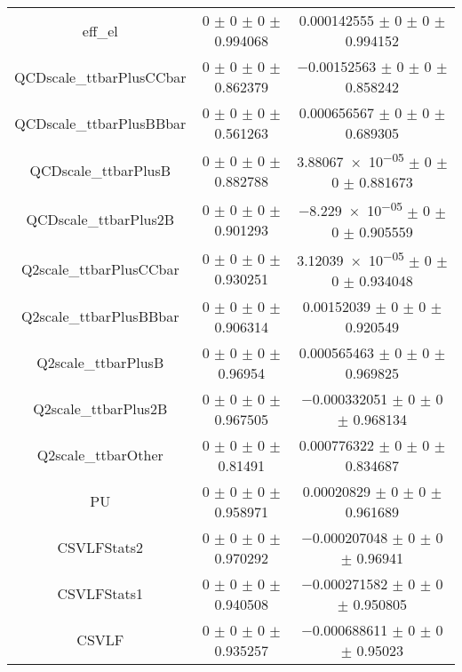\begin{table}
\begin{tabular}{ccc}
eff\_el & \num{0} $\pm$ \num{0} $\pm$ \num{0} $\pm$ \num{0.994068} & \num{0.000142555} $\pm$ \num{0} $\pm$ \num{0} $\pm$ \num{0.994152}\\
QCDscale\_ttbarPlusCCbar & \num{0} $\pm$ \num{0} $\pm$ \num{0} $\pm$ \num{0.862379} & \num{-0.00152563} $\pm$ \num{0} $\pm$ \num{0} $\pm$ \num{0.858242}\\
QCDscale\_ttbarPlusBBbar & \num{0} $\pm$ \num{0} $\pm$ \num{0} $\pm$ \num{0.561263} & \num{0.000656567} $\pm$ \num{0} $\pm$ \num{0} $\pm$ \num{0.689305}\\
QCDscale\_ttbarPlusB & \num{0} $\pm$ \num{0} $\pm$ \num{0} $\pm$ \num{0.882788} & \num{3.88067e-05} $\pm$ \num{0} $\pm$ \num{0} $\pm$ \num{0.881673}\\
QCDscale\_ttbarPlus2B & \num{0} $\pm$ \num{0} $\pm$ \num{0} $\pm$ \num{0.901293} & \num{-8.229e-05} $\pm$ \num{0} $\pm$ \num{0} $\pm$ \num{0.905559}\\
Q2scale\_ttbarPlusCCbar & \num{0} $\pm$ \num{0} $\pm$ \num{0} $\pm$ \num{0.930251} & \num{3.12039e-05} $\pm$ \num{0} $\pm$ \num{0} $\pm$ \num{0.934048}\\
Q2scale\_ttbarPlusBBbar & \num{0} $\pm$ \num{0} $\pm$ \num{0} $\pm$ \num{0.906314} & \num{0.00152039} $\pm$ \num{0} $\pm$ \num{0} $\pm$ \num{0.920549}\\
Q2scale\_ttbarPlusB & \num{0} $\pm$ \num{0} $\pm$ \num{0} $\pm$ \num{0.96954} & \num{0.000565463} $\pm$ \num{0} $\pm$ \num{0} $\pm$ \num{0.969825}\\
Q2scale\_ttbarPlus2B & \num{0} $\pm$ \num{0} $\pm$ \num{0} $\pm$ \num{0.967505} & \num{-0.000332051} $\pm$ \num{0} $\pm$ \num{0} $\pm$ \num{0.968134}\\
Q2scale\_ttbarOther & \num{0} $\pm$ \num{0} $\pm$ \num{0} $\pm$ \num{0.81491} & \num{0.000776322} $\pm$ \num{0} $\pm$ \num{0} $\pm$ \num{0.834687}\\
PU & \num{0} $\pm$ \num{0} $\pm$ \num{0} $\pm$ \num{0.958971} & \num{0.00020829} $\pm$ \num{0} $\pm$ \num{0} $\pm$ \num{0.961689}\\
CSVLFStats2 & \num{0} $\pm$ \num{0} $\pm$ \num{0} $\pm$ \num{0.970292} & \num{-0.000207048} $\pm$ \num{0} $\pm$ \num{0} $\pm$ \num{0.96941}\\
CSVLFStats1 & \num{0} $\pm$ \num{0} $\pm$ \num{0} $\pm$ \num{0.940508} & \num{-0.000271582} $\pm$ \num{0} $\pm$ \num{0} $\pm$ \num{0.950805}\\
CSVLF & \num{0} $\pm$ \num{0} $\pm$ \num{0} $\pm$ \num{0.935257} & \num{-0.000688611} $\pm$ \num{0} $\pm$ \num{0} $\pm$ \num{0.95023}\\

\end{tabular}
\end{table}
